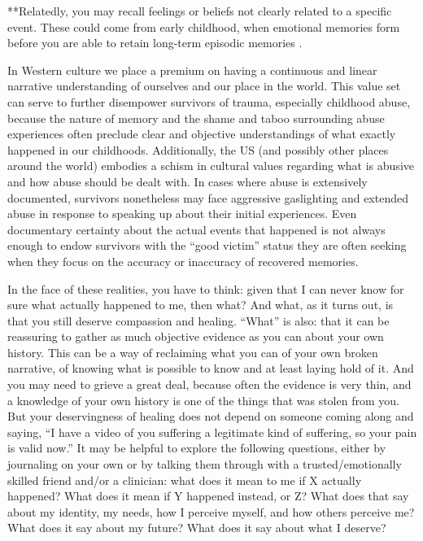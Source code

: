 \documentclass[12pt,letterpaper]{book}
\begin{document}
**Relatedly, you may recall feelings or beliefs not clearly related to a specific event. These could come from early childhood, when emotional memories form before you are able to retain long-term episodic memories \cite{brownAttachmentDisturbances}.

In Western  culture we place a premium on having a continuous and linear narrative understanding of ourselves and our place in the world. This value set can serve to further disempower survivors of trauma, especially childhood abuse, because the nature of memory and the shame and taboo surrounding abuse experiences often preclude clear and objective understandings of what exactly happened in our childhoods. Additionally, the US (and possibly other places around the world) embodies a schism in cultural values regarding what is abusive and how abuse should be dealt with. In cases where abuse is extensively documented, survivors nonetheless may face aggressive gaslighting and extended abuse in response to speaking up about their initial experiences. Even documentary certainty about the actual events that happened is not always enough to endow survivors with the “good victim” status they are often seeking when they focus on the accuracy or inaccuracy of recovered memories.

In the face of these realities, you have to think: given that I can never know for sure what actually happened to me, then what? And what, as it turns out, is that you still deserve compassion and healing. “What” is also: that it can be reassuring to gather as much objective evidence as you can about your own history. This can be a way of reclaiming what you can of your own broken narrative, of knowing what is possible to know and at least laying hold of it. And you may need to grieve a great deal, because often the evidence is very thin, and a knowledge of your own history is one of the things that was stolen from you. But your deservingness of healing does not depend on someone coming along and saying, “I have a video of you suffering a legitimate kind of suffering, so your pain is valid now.” It may be helpful to explore the following questions, either by journaling on your own or by talking them through with a trusted/emotionally skilled friend and/or a clinician: what does it mean to me if X actually happened? What does it mean if Y happened instead, or Z? What does that say about my identity, my needs, how I perceive myself, and how others perceive me? What does it say about my future? What does it say about what I deserve?
\end{document}
